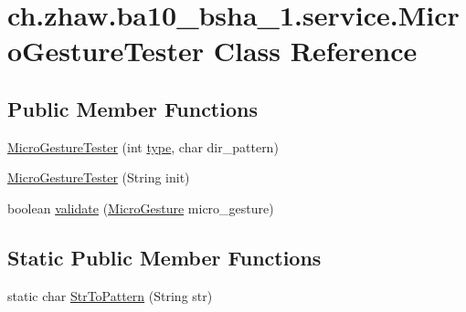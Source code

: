 \hypertarget{classch_1_1zhaw_1_1ba10__bsha__1_1_1service_1_1MicroGestureTester}{
\section{ch.zhaw.ba10\_\-bsha\_\-1.service.MicroGestureTester Class Reference}
\label{classch_1_1zhaw_1_1ba10__bsha__1_1_1service_1_1MicroGestureTester}
}
\subsection*{Public Member Functions}
\begin{DoxyCompactItemize}
\item 
\hyperlink{classch_1_1zhaw_1_1ba10__bsha__1_1_1service_1_1MicroGestureTester_a168b10f8692c3b78d909d2bbcf953cae}{MicroGestureTester} (int \hyperlink{classch_1_1zhaw_1_1ba10__bsha__1_1_1service_1_1MicroGestureTester_a1bf3c9be31f7a6293aa8e6d30e51fd56}{type}, char dir\_\-pattern)
\item 
\hyperlink{classch_1_1zhaw_1_1ba10__bsha__1_1_1service_1_1MicroGestureTester_ac8c8bca517c9612baa7c7b4913c8070a}{MicroGestureTester} (String init)
\item 
boolean \hyperlink{classch_1_1zhaw_1_1ba10__bsha__1_1_1service_1_1MicroGestureTester_a0ec321204f2eb55d1fa0ce77a6df4654}{validate} (\hyperlink{classch_1_1zhaw_1_1ba10__bsha__1_1_1service_1_1MicroGesture}{MicroGesture} micro\_\-gesture)
\end{DoxyCompactItemize}
\subsection*{Static Public Member Functions}
\begin{DoxyCompactItemize}
\item 
static char \hyperlink{classch_1_1zhaw_1_1ba10__bsha__1_1_1service_1_1MicroGestureTester_aa41e1a503c94f303bea8c1e2a50b930d}{StrToPattern} (String str)
\end{DoxyCompactItemize}
